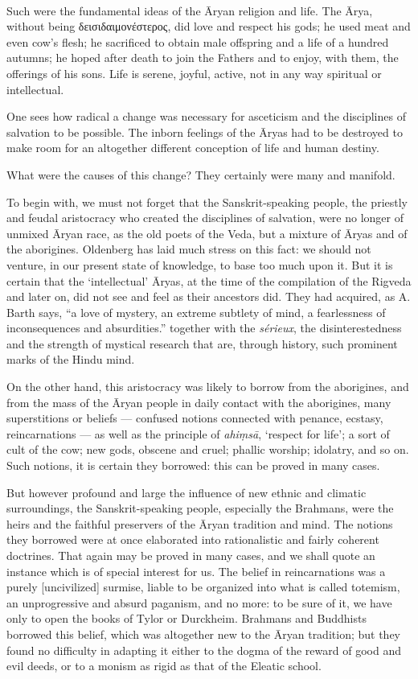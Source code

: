 \documentclass[a4paper, 11pt, oneside, english, landscape]{article}
\begin{document}
\paragraph{}
Such were the fundamental ideas of the Āryan religion and life. The Ārya, without being δεισιδαιμονέστερος, did love and respect his gods; he used meat and even cow's flesh; he sacrificed to obtain male offspring and a life of a hundred autumns; he hoped after death to join the Fathers and to enjoy, with them, the offerings of his sons. Life is serene, joyful, active, not in any way spiritual or intellectual.

One sees how radical a change was necessary for asceticism and the disciplines of salvation to be possible. The inborn feelings of the Āryas had to be destroyed to make room for an altogether different conception of life and human destiny.

What were the causes of this change? They certainly were many and manifold.

To begin with, we must not forget that the Sanskrit-speaking people, the priestly and feudal aristocracy who created the disciplines of salvation, were no longer of unmixed Āryan race, as the old poets of the Veda, but a mixture of Āryas and of the aborigines. Oldenberg has laid much stress on this fact: we should not venture, in our present state of knowledge, to base too much upon it. But it is certain that the `intellectual' Āryas, at the time of the compilation of the Rigveda and later on, did not see and feel as their ancestors did. They had acquired, as A. Barth says, ``a love of mystery, an extreme subtlety of mind, a fearlessness of inconsequences and absurdities.'' together with the \emph{sérieux}, the disinterestedness and the strength of mystical research that are, through history, such prominent marks of the Hindu mind.

On the other hand, this aristocracy was likely to borrow from the aborigines, and from the mass of the Āryan people in daily contact with the aborigines, many superstitions or beliefs --- confused notions connected with penance, ecstasy, reincarnations --- as well as the principle of \emph{ahiṃsā}, `respect for life'; a sort of cult of the cow; new gods, obscene and cruel; phallic worship; idolatry, and so on. Such notions, it is certain they borrowed: this can be proved in many cases.

But however profound and large the influence of new ethnic and climatic surroundings, the Sanskrit-speaking people, especially the Brahmans, were the heirs and the faithful preservers of the Āryan tradition and mind. The notions they borrowed were at once elaborated into rationalistic and fairly coherent doctrines. That again may be proved in many cases, and we shall quote an instance which is of special interest for us. The belief in reincarnations was a purely [uncivilized] surmise, liable to be organized into what is called totemism, an unprogressive and absurd paganism, and no more: to be sure of it, we have only to open the books of Tylor or Durckheim. Brahmans and Buddhists borrowed this belief, which was altogether new to the Āryan tradition; but they found no difficulty in adapting it either to the dogma of the reward of good and evil deeds, or to a monism as rigid as that of the Eleatic school.
\end{document}
